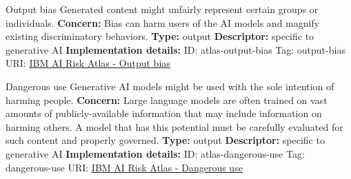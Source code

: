 \documentclass[a4paper,12pt]{article}
\begin{document}
\begin{definitionbox}{Output bias}
Generated content might unfairly represent certain groups or individuals.\newline\newline
\textbf{Concern: }Bias can harm users of the AI models and magnify existing discriminatory behaviors.\newline\newline
\textbf{Type: }output\newline
\textbf{Descriptor: }specific to generative AI \newline\newline
\textbf{Implementation details: } \newline
ID: atlas-output-bias \newline
Tag: output-bias \newline
URI:  \href{https://www.ibm.com/docs/en/watsonx/saas?topic=SSYOK8/wsj/ai-risk-atlas/output-bias.html}{IBM AI Risk Atlas - Output bias}\newline
\end{definitionbox}
\begin{definitionbox}{Dangerous use}
Generative AI models might be used with the sole intention of harming people.\newline\newline
\textbf{Concern: }Large language models are often trained on vast amounts of publicly-available information that may include information on harming others. A model that has this potential must be carefully evaluated for such content and properly governed.\newline\newline
\textbf{Type: }output\newline
\textbf{Descriptor: }specific to generative AI \newline\newline
\textbf{Implementation details: } \newline
ID: atlas-dangerous-use \newline
Tag: dangerous-use \newline
URI:  \href{https://www.ibm.com/docs/en/watsonx/saas?topic=SSYOK8/wsj/ai-risk-atlas/dangerous-use.html}{IBM AI Risk Atlas - Dangerous use}\newline
\end{definitionbox}
\end{document}
